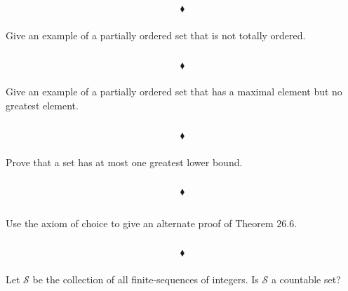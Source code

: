 $$\blacklozenge$$

\subsubsection{}
\begin{tcolorbox}
Give an example of a partially ordered set that is not totally ordered.  
\end{tcolorbox}
$$ $$

$$\blacklozenge$$

\subsubsection{}
\begin{tcolorbox}
Give an example of a partially ordered set that has a maximal element but no greatest element. 
\end{tcolorbox}
$$ $$

$$\blacklozenge$$

\subsubsection{}
\begin{tcolorbox}
Prove that a set has at most one greatest lower bound. 
\end{tcolorbox}
$$ $$

$$\blacklozenge$$



\renewcommand{\thesubsection}{\thesection.\RomanNumeralCaps{11}}
\subsection{}
\subsubsection{}
\begin{tcolorbox}
Use the axiom of choice to give an alternate proof of Theorem $\mathbf{26.6}$. 

\end{tcolorbox}
$$ $$

$$\blacklozenge$$

\subsubsection{}
\begin{tcolorbox}
Let $\mathscr{S}$ be the collection of all finite-sequences of integers. Is $\mathscr{S}$ a countable set? 
\end{tcolorbox}
$$ $$

